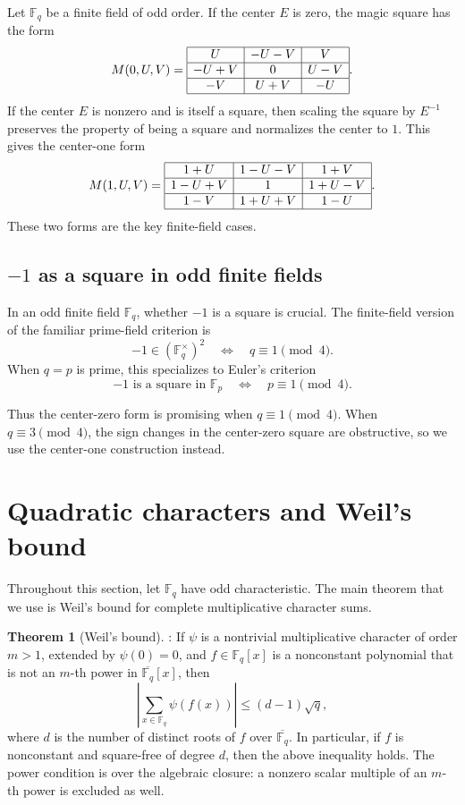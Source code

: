 \documentclass{article}
\newcommand{\F}{\mathbb F}
\theoremstyle{definition}
\newtheorem{theorem}{Theorem}
\numberwithin{equation}{section}
\begin{document}
Let \(\F_q\) be a finite field of odd order. If the center \(E\) is zero, the
magic square has the form
\[
M(0,U,V)=
\begin{array}{|c|c|c|}
\hline
U & -U-V & V\\
\hline
-U+V & 0 & U-V\\
\hline
-V & U+V & -U\\
\hline
\end{array}.
\]
If the center \(E\) is nonzero and is itself a square, then scaling the square by
\(E^{-1}\) preserves the property of being a square and normalizes the center to
\(1\). This gives the center-one form
\[
M(1,U,V)=
\begin{array}{|c|c|c|}
\hline
1+U & 1-U-V & 1+V\\
\hline
1-U+V & 1 & 1+U-V\\
\hline
1-V & 1+U+V & 1-U\\
\hline
\end{array}.
\]
These two forms are the key finite-field cases.

\subsection{\(-1\) as a square in odd finite fields}

In an odd finite field \(\F_q\), whether \(-1\) is a square is crucial. The finite-field version of the familiar prime-field criterion is
\[
-1\in(\F_q^\times)^2 \quad\Longleftrightarrow\quad q\equiv1\pmod4.
\]
When \(q=p\) is prime, this specializes to Euler's criterion
\[
-1\text{ is a square in }\F_p \quad\Longleftrightarrow\quad p\equiv1\pmod4.
\]

Thus the center-zero form is promising when \(q\equiv1\pmod4\). When \(q\equiv3\pmod4\), the sign changes in the center-zero square are obstructive, so we use the center-one construction instead.

\section{Quadratic characters and Weil's bound}

Throughout this section, let \(\F_q\) have odd characteristic. The main theorem that we use is Weil's bound for complete multiplicative character sums.
\begin{theorem}[Weil's bound]
\label{weil}
\cite[Theorem 5.41]{LidlNiederreiterFiniteFields}: If
\(\psi\) is a nontrivial multiplicative character of order \(m>1\),
extended by \(\psi(0)=0\), and \(f\in\F_q[x]\) is a nonconstant
polynomial that is not an \(m\)-th power in
\(\overline{\F_q}[x]\), then
\[
\left|\sum_{x\in\F_q}\psi(f(x))\right|
\le (d-1)\sqrt q,
\]
where \(d\) is the number of distinct roots of \(f\) over
\(\overline{\F_q}\). In particular, if \(f\) is nonconstant and
square-free of degree \(d\), then the above inequality holds.
The power condition is over the algebraic closure: a nonzero scalar
multiple of an \(m\)-th power is excluded as well.
\end{theorem}
\end{document}
